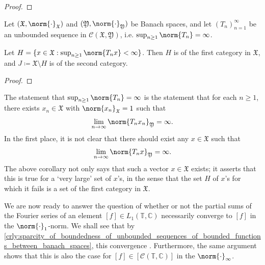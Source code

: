 \documentclass[notoc,notitlepage]{tufte-book}
\begin{document}
\begin{proof}
\end{proof}

\begin{crly}\label{crly:sparcity_of_boundedness_of_unbounded_sequences_of_bounded_functions_between_banach_spaces}
  Let $(\mathfrak{X}, \norm{\cdot}_{\mathfrak{X}})$ and
  $(\mathfrak{Y}, \norm{\cdot}_{\mathfrak{Y}})$ be Banach spaces, and let
  $(T_n)_{n=1}^{\infty}$ be an unbounded sequence in
  $\mathcal{C}(\mathfrak{X}, \mathfrak{Y})$,
  i.e.  $\sup_{n \geq 1} \norm{T_n} = \infty$.

  Let $H = \{ x \in \mathfrak{X} : \sup_{n \geq 1} \norm{T_n x} < \infty \}$.
  Then $H$ is of the first category in $\mathfrak{X}$, and
  $J \coloneqq \mathfrak{X} \setminus H$ is of the second category.
\end{crly}

\begin{proof}
\end{proof}

\begin{remark}
  The statement that $\sup_{n \geq 1} \norm{T_n} = \infty$
  is the statement that for each $n \geq 1$, there exists $x_n \in \mathfrak{X}$
  with $\norm{x_n}_{\mathfrak{X}} = 1$ such that
  \begin{equation*}
    \lim_{n \to \infty} \norm{T_n x_n}_{\mathfrak{Y}} = \infty.
  \end{equation*}
  In the first place, it is not clear that there should exist
  any $x \in \mathfrak{X}$ such that
  \begin{equation*}
    \lim_{n \to \infty} \norm{T_n x}_{\mathfrak{Y}} = \infty.
  \end{equation*}
  The above corollary not only says that such a vector $x \in \mathfrak{X}$ exists;
  it asserts that this is true for a `very large' set of $x$'s,
  in the sense that the set $H$ of $x$'s for which it fails
  is a set of the first category in $\mathfrak{X}$.
\end{remark}

We are now ready to answer the question of whether or not
the partial sums of the Fourier series of an element
$[f] \in L_1(\mathbb{T}, \mathbb{C})$ necessarily converge to $[f]$
in the $\norm{\cdot}_1$-norm.
We shall see that by
\cref{crly:sparcity_of_boundedness_of_unbounded_sequences_of_bounded_functions_between_banach_spaces},
this convergence .
Furthermore, the same argument shows that this is also
the case for $[f] \in [\mathcal{C}(\mathbb{T}, \mathbb{C})]$
in the $\norm{\cdot}_{\infty}$.
\end{document}
